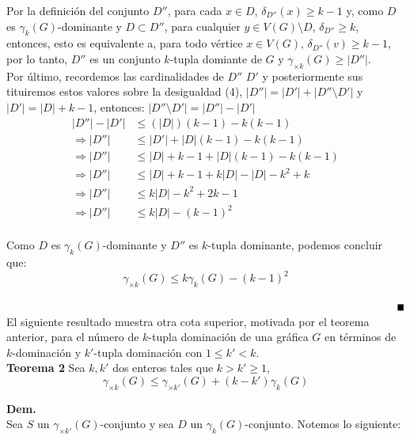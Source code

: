 \documentclass{article}
\begin{document}
Por la definición del conjunto $D''$, para cada $x\in D$, $\delta_{D''}(x)\geq k-1$ y, como $D$ es $\gamma_k(G)$-dominante y $D\subset D''$, para cualquier $y\in V(G)\setminus D$, $\delta_{D''}\geq k$, entonces, esto es equivalente a, para todo vértice $x\in V(G)$, $\delta_{D''}(v)\geq k-1$, por lo tanto, $D''$ es un conjunto $k$-tupla domiante de $G$ y $\gamma_{\times k}(G)\geq |D''|$. \\

Por último, recordemos las cardinalidades de $D''$ $D'$ y posteriormente sus tituiremos estos valores sobre la desigualdad (4), $|D''|=|D'|+|D''\setminus D'|$ y $|D'|=|D|+k-1$, entonces: $|D''\setminus D'|=|D''|-|D'|$\\


\begin{align*}
|D''|-|D'|&\leq (|D|)(k-1)-k(k-1)\\
\Longrightarrow |D''|&\leq |D'|+|D|(k-1)-k(k-1)\\
\Longrightarrow|D''|&\leq|D|+k-1+ |D|(k-1)-k(k-1)\\
\Longrightarrow|D''|&\leq |D|+k-1+k|D|-|D|-k^2+k\\
\Longrightarrow|D''|&\leq k|D|-k^2+2k-1\\
\Longrightarrow|D''|&\leq k|D|-(k-1)^2\\
\end{align*}

Como $D$ es $\gamma_k(G)$-dominante y $D''$ es $k$-tupla dominante, podemos concluir que:\\
$$\gamma_{\times k}(G)\leq k\gamma_k(G)-(k-1)^2 $$  \newline

 $\hspace{15.5cm}\blacksquare$\\


El siguiente resultado muestra otra cota superior, motivada por el teorema anterior, para el número de $k$-tupla dominación de una gráfica $G$ en términos de $k$-dominación y $k'$-tupla dominación con $1 \le k' < k$.\\

\textbf{Teorema 2} Sea $k, k'$ dos enteros tales que $k > k' \geq 1$,
$$\gamma_{\times k}(G) \leq \gamma_{\times k'}(G) + (k - k')\gamma_{k}(G)$$

\textbf{Dem.}\\
Sea $S$ un $\gamma_{\times k'}(G)$-conjunto y sea $D$ un $\gamma_{k}(G)$-conjunto. Notemos lo siguiente:\\
\end{document}
